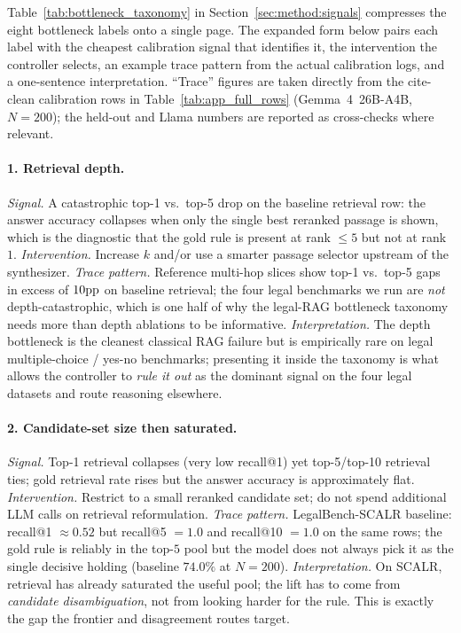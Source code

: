 Table~\ref{tab:bottleneck_taxonomy} in Section~\ref{sec:method:signals}
compresses the eight bottleneck labels onto a single page. The expanded
form below pairs each label with the cheapest calibration signal that
identifies it, the intervention the controller selects, an example trace
pattern from the actual calibration logs, and a one-sentence
interpretation. ``Trace'' figures are taken directly from the cite-clean
calibration rows in Table~\ref{tab:app_full_rows} (Gemma~4~26B-A4B,
$N{=}200$); the held-out and Llama numbers are reported as cross-checks
where relevant.

\paragraph{1. Retrieval depth.}
\emph{Signal.} A catastrophic top-1 vs.\ top-5 drop on the baseline
retrieval row: the answer accuracy collapses when only the single best
reranked passage is shown, which is the diagnostic that the gold rule is
present at rank $\leq 5$ but not at rank $1$.
\emph{Intervention.} Increase $k$ and/or use a smarter passage selector
upstream of the synthesizer.
\emph{Trace pattern.} Reference multi-hop slices show top-1 vs.\ top-5
gaps in excess of $10\mathrm{pp}$ on baseline retrieval; the four legal
benchmarks we run are \emph{not} depth-catastrophic, which is one half of
why the legal-RAG bottleneck taxonomy needs more than depth ablations to
be informative.
\emph{Interpretation.} The depth bottleneck is the cleanest classical
RAG failure but is empirically rare on legal multiple-choice / yes-no
benchmarks; presenting it inside the taxonomy is what allows the
controller to \emph{rule it out} as the dominant signal on the four
legal datasets and route reasoning elsewhere.

\paragraph{2. Candidate-set size then saturated.}
\emph{Signal.} Top-1 retrieval collapses (very low recall@1) yet
top-5/top-10 retrieval ties; gold retrieval rate rises but the answer
accuracy is approximately flat.
\emph{Intervention.} Restrict to a small reranked candidate set; do not
spend additional LLM calls on retrieval reformulation.
\emph{Trace pattern.} LegalBench-SCALR baseline: recall@1 $\approx 0.52$
but recall@5 $= 1.0$ and recall@10 $= 1.0$ on the same rows; the gold
rule is reliably in the top-$5$ pool but the model does not always pick
it as the single decisive holding (baseline $74.0\%$ at $N{=}200$).
\emph{Interpretation.} On SCALR, retrieval has already saturated the
useful pool; the lift has to come from \emph{candidate disambiguation},
not from looking harder for the rule. This is exactly the gap the
frontier and disagreement routes target.

